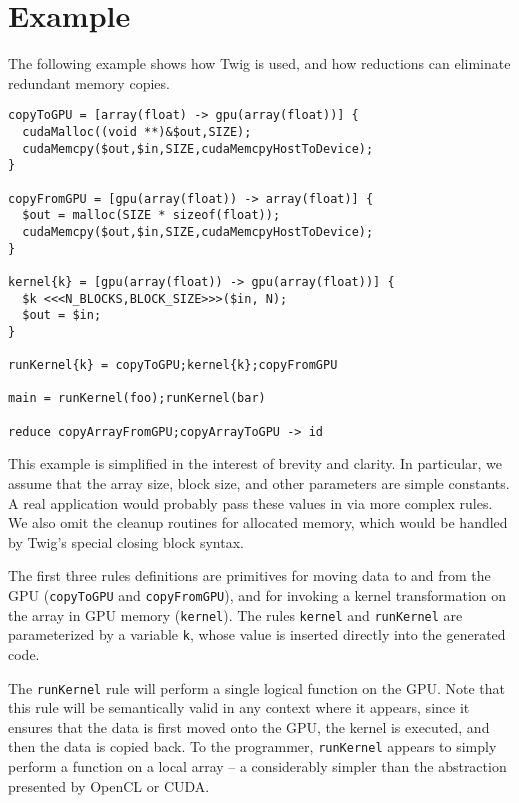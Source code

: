 
\section{Example}

The following example shows how Twig is used, and how reductions can eliminate
redundant memory copies.

\begin{verbatim}
copyToGPU = [array(float) -> gpu(array(float))] {
  cudaMalloc((void **)&$out,SIZE);
  cudaMemcpy($out,$in,SIZE,cudaMemcpyHostToDevice);
}

copyFromGPU = [gpu(array(float)) -> array(float)] {
  $out = malloc(SIZE * sizeof(float));
  cudaMemcpy($out,$in,SIZE,cudaMemcpyHostToDevice);
}

kernel{k} = [gpu(array(float)) -> gpu(array(float))] {
  $k <<<N_BLOCKS,BLOCK_SIZE>>>($in, N);
  $out = $in;
}

runKernel{k} = copyToGPU;kernel{k};copyFromGPU

main = runKernel(foo);runKernel(bar)

reduce copyArrayFromGPU;copyArrayToGPU -> id
\end{verbatim}

This example is simplified in the interest of brevity and clarity. In
particular, we assume that the array size, block size, and other parameters are
simple constants. A real application would probably pass these values in via
more complex rules. We also omit the cleanup routines for allocated memory,
which would be handled by Twig's special closing block syntax.

The first three rules definitions are primitives for moving data to and from the
GPU (\texttt{copyToGPU} and \texttt{copyFromGPU}), and for invoking a kernel
transformation on the array in GPU memory (\texttt{kernel}). The rules
\texttt{kernel} and \texttt{runKernel} are parameterized by a variable
\texttt{k}, whose value is inserted directly into the generated code.

The \texttt{runKernel} rule will perform a single logical function on the GPU.
Note that this rule will be semantically valid in any context where it appears,
since it ensures that the data is first moved onto the GPU, the kernel is
executed, and then the data is copied back. To the programmer,
\texttt{runKernel} appears to simply perform a function on a local array -- a
considerably simpler than the abstraction presented by OpenCL or CUDA.

